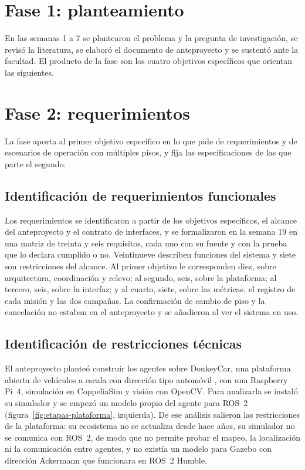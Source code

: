 \section{Fase 1: planteamiento}
\label{sec:fase1}

En las semanas 1 a 7 se plantearon el problema y la pregunta de investigación, se revisó la literatura, se elaboró el documento de anteproyecto y se sustentó ante la facultad. El producto de la fase son los cuatro objetivos específicos que orientan las siguientes.

\section{Fase 2: requerimientos}
\label{sec:fase2}

La fase aporta al primer objetivo específico en lo que pide de requerimientos y de escenarios de operación con múltiples pisos, y fija las especificaciones de las que parte el segundo.

\subsection{Identificación de requerimientos funcionales}

Los requerimientos se identificaron a partir de los objetivos específicos, el alcance del anteproyecto y el contrato de interfaces, y se formalizaron en la semana 19 en una matriz de treinta y seis requisitos, cada uno con su fuente y con la prueba que lo declara cumplido o no. Veintinueve describen funciones del sistema y siete son restricciones del alcance. Al primer objetivo le corresponden diez, sobre arquitectura, coordinación y relevo; al segundo, seis, sobre la plataforma; al tercero, seis, sobre la interfaz; y al cuarto, siete, sobre las métricas, el registro de cada misión y las dos campañas. La confirmación de cambio de piso y la cancelación no estaban en el anteproyecto y se añadieron al ver el sistema en uso.

\subsection{Identificación de restricciones técnicas}
\label{sec:donkeycar}

El anteproyecto planteó construir los agentes sobre DonkeyCar, una plataforma abierta de vehículos a escala con dirección tipo automóvil \autocite{donkeycar}, con una Raspberry Pi~4, simulación en CoppeliaSim y visión con OpenCV. Para analizarla se instaló su simulador y se empezó un modelo propio del agente para ROS~2 (figura~\ref{fig:etapas-plataforma}, izquierda). De ese análisis salieron las restricciones de la plataforma: su ecosistema no se actualiza desde hace años, su simulador no se comunica con ROS~2, de modo que no permite probar el mapeo, la localización ni la comunicación entre agentes, y no existía un modelo para Gazebo con dirección Ackermann que funcionara en ROS~2 Humble.

